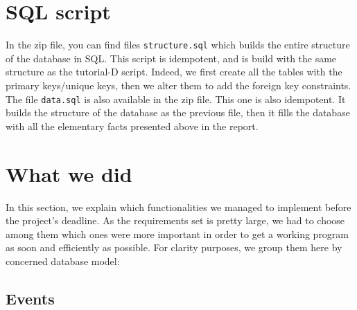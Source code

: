\documentclass[a4paper ,12pt,french]{article}
\begin{document}
\section{SQL script}

In the zip file, you can find files \texttt{structure.sql} which builds the entire structure of the database in SQL. This script is idempotent, and is build with the same structure as the tutorial-D script. Indeed, we first create all the tables with the primary keys/unique keys, then we alter them to add the foreign key constraints.\\


The file \texttt{data.sql} is also available in the zip file. This one is also idempotent. It builds the structure of the database as the previous file, then it fills the database with all the elementary facts presented above in the report.

\section{What we did}

In this section, we explain which functionalities we managed to implement before the project’s deadline. As the requirements set is pretty large, we had to choose among them which ones were more important in order to get a working program as soon and efficiently as possible. For clarity purposes, we group them here by concerned database model:

\subsection{Events}
\end{document}
